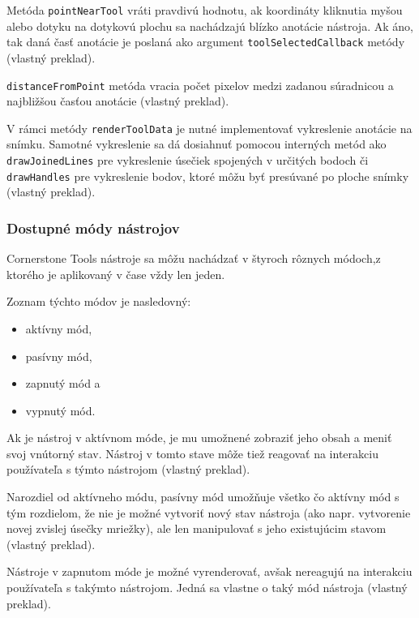Metóda \texttt{pointNearTool} vráti pravdivú hodnotu, ak koordináty kliknutia myšou alebo dotyku na dotykovú plochu sa nachádzajú blízko anotácie nástroja. Ak áno, tak daná časť anotácie je poslaná ako argument \texttt{toolSelectedCallback} metódy \cite{base_tool_description} (vlastný preklad).

\texttt{distanceFromPoint} metóda vracia počet pixelov medzi zadanou súradnicou a najbližšou časťou anotácie \cite{base_tool_description} (vlastný preklad).

V rámci metódy \texttt{renderToolData} je nutné implementovať vykreslenie anotácie na snímku. Samotné vykreslenie sa dá dosiahnuť pomocou interných metód ako \texttt{drawJoinedLines} pre vykreslenie úsečiek spojených v určitých bodoch či \texttt{drawHandles} pre vykreslenie bodov, ktoré môžu byť presúvané po ploche snímky \cite{base_tool_description} (vlastný preklad).

\clearpage

\subsubsection {Dostupné módy nástrojov}
Cornerstone Tools nástroje sa môžu nachádzať v štyroch rôznych módoch,\newline z ktorého je aplikovaný v čase vždy len jeden.

Zoznam týchto módov je nasledovný:
\begin {itemize}
\item {aktívny mód,}
\item {pasívny mód,}
\item {zapnutý mód a}
\item {vypnutý mód.}
\end {itemize}

Ak je nástroj v aktívnom móde, je mu umožnené zobraziť jeho obsah a meniť svoj vnútorný stav. Nástroj v tomto stave môže tiež reagovať na interakciu používateľa s týmto nástrojom \cite{cornerstone_tools_modes} (vlastný preklad).

Narozdiel od aktívneho módu, pasívny mód umožňuje všetko čo aktívny mód s tým rozdielom, že nie je možné vytvoriť nový stav nástroja (ako napr. vytvorenie novej zvislej úsečky mriežky), ale len manipulovať s jeho existujúcim stavom \cite{cornerstone_tools_modes} (vlastný preklad).

Nástroje v zapnutom móde je možné vyrenderovať, avšak nereagujú na interakciu používateľa s takýmto nástrojom. Jedná sa vlastne o taký  mód nástroja \cite{cornerstone_tools_modes} (vlastný preklad).

